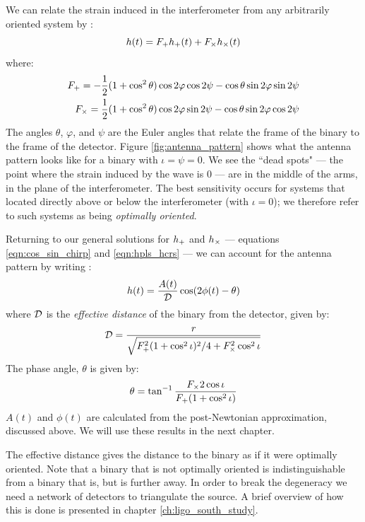 We can relate the strain induced in the interferometer from any arbitrarily oriented system by \cite{Brown}:
\begin{equation}
h(t) = F_{+} h_{+}(t) + F_{\times} h_{\times}(t)
\end{equation}
where:
\begin{align}
F_{+} = -\frac{1}{2} (1 + \cos^2 \theta)\cos 2\varphi \cos 2\psi - \cos\theta \sin2\varphi \sin 2\psi \\
F_{\times} = \frac{1}{2}(1 + \cos^2 \theta)\cos 2\varphi \sin2\psi - \cos\theta \sin2\varphi \cos 2\psi
\end{align}
The angles $\theta$, $\varphi$, and $\psi$ are the Euler angles that relate the frame of the binary to the frame of the detector. Figure \ref{fig:antenna_pattern} shows what the antenna pattern looks like for a binary with $\iota = \psi = 0$. We see the ``dead spots" --- the point where the strain induced by the wave is $0$ --- are in the middle of the arms, in the plane of the interferometer. The best sensitivity occurs for systems that located directly above or below the interferometer (with $\iota = 0$); we therefore refer to such systems as being \emph{optimally oriented}.

Returning to our general solutions for $h_{+}$ and $h_{\times}$ --- equations \ref{eqn:cos_sin_chirp} and \ref{eqn:hpls_hcrs} --- we can account for the antenna pattern by writing \cite{Brown}:
\begin{equation}
\label{eqn:GW_strain}
h(t) = \frac{A(t)}{\effD} \cos(2\phi(t) - \theta)
\end{equation}
where $\mathcal{D}$ is the \emph{effective distance} of the binary from the detector, given by:
\begin{equation}
\mathcal{D} = \frac{r}{\sqrt{ F_{+}^2(1 + \cos^2\iota)^2/4 + F_{\times}^2\cos^2 \iota}}
\end{equation}
The phase angle, $\theta$ is given by:
\begin{equation}
\theta = \tan^{-1} \frac{F_{\times} 2\cos \iota}{F_{+}(1 + \cos^2 \iota)}
\end{equation}
$A(t)$ and $\phi(t)$ are calculated from the post-Newtonian approximation, discussed above. We will use these results in the next chapter.

The effective distance gives the distance to the binary as if it were optimally oriented. Note that a binary that is not optimally oriented is indistinguishable from a binary that is, but is further away. In order to break the degeneracy we need a network of detectors to triangulate the source. A brief overview of how this is done is presented in chapter \ref{ch:ligo_south_study}.

